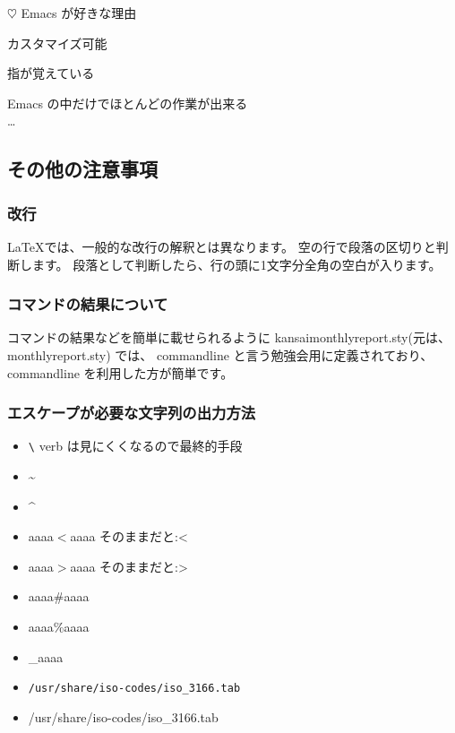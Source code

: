 \documentclass[mingoth,a4paper]{jsarticle}
\begin{document}
\begin{commandline}
\begin{commandline}
\begin{list}%
 {$\heartsuit$} %
 {Emacs が好きな理由} %
 \item カスタマイズ可能
 \item 指が覚えている
 \item Emacs の中だけでほとんどの作業が出来る\\
\dots{}
\end{list}
\end{commandline}

\subsection{その他の注意事項}

\subsubsection{改行}

\LaTeX では、一般的な改行の解釈とは異なります。
空の行で段落の区切りと判断します。
段落として判断したら、行の頭に1文字分全角の空白が入ります。

\subsubsection{コマンドの結果について}

コマンドの結果などを簡単に載せられるように
kansaimonthlyreport.sty(元は、monthlyreport.sty) では、
commandline と言う勉強会用に定義されており、
commandline を利用した方が簡単です。

\subsubsection{エスケープが必要な文字列の出力方法}

\begin{itemize}
 \item \verb!\! verb は見にくくなるので最終的手段
 \item \~{}
 \item \^{}
 \item aaaa$<$aaaa そのままだと:<
 \item aaaa$>$aaaa そのままだと:>
 \item aaaa\#aaaa
 \item aaaa\%aaaa
 \item \_{}aaaa
\end{itemize}

\begin{itemize}
 \item {\tt /usr/share/iso-codes/iso\_3166.tab}
 \item /usr/share/iso-codes/iso\_{}3166.tab
\end{itemize}


\end{commandline}
\end{document}
